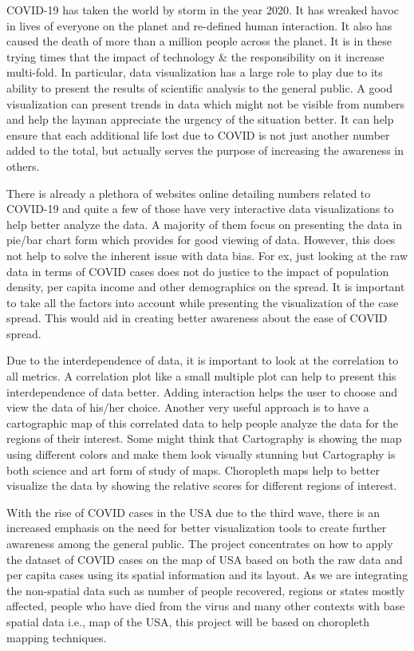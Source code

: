 COVID-19 has taken the world by storm in the year 2020. It has wreaked havoc in lives of everyone on the planet and re-defined human interaction. It also has caused the death of more than a million people across the planet. It is in these trying times that the impact of technology \& the responsibility on it increase multi-fold. In particular, data visualization has a large role to play due to its ability to present the results of scientific analysis to the general public. A good visualization can present trends in data which might not be visible from numbers and help the layman appreciate the urgency of the situation better. It can help ensure that each additional life lost due to COVID is not just another number added to the total, but actually serves the purpose of increasing the awareness in others.

There is already a plethora of websites online detailing numbers related to COVID-19 and quite a few of those have very interactive data visualizations to help better analyze the data. A majority of them focus on presenting the data in pie/bar chart form which provides for good viewing of data. However, this does not help to solve the inherent issue with data bias. For ex, just looking at the raw data in terms of COVID cases does not do justice to the impact of population density, per capita income and other demographics on the spread. It is important to take all the factors into account while presenting the visualization of the case spread. This would aid in creating better awareness about the ease of COVID spread.

Due to the interdependence of data, it is important to look at the correlation to all metrics. A correlation plot like a small multiple plot can help to present this interdependence of data better. Adding interaction helps the user to choose and view the data of his/her choice. Another very useful approach is to have a cartographic map of this correlated data to help people analyze the data for the regions of their interest. Some might think that Cartography is showing the map using different colors and make them look visually stunning but Cartography is both science and art form of study of maps. Choropleth maps help to better visualize the data by showing the relative scores for different regions of interest.

With the rise of COVID cases in the USA due to the third wave, there is an increased emphasis on the need for better visualization tools to create further awareness among the general public. The project concentrates on how to apply the dataset of COVID cases on the map of USA based on both the raw data and per capita cases using its spatial information and its layout. As we are integrating the non-spatial data such as number of people recovered, regions or states mostly affected, people who have died from the virus and many other contexts with base spatial data i.e., map of the USA, this project will be based on choropleth mapping techniques.

